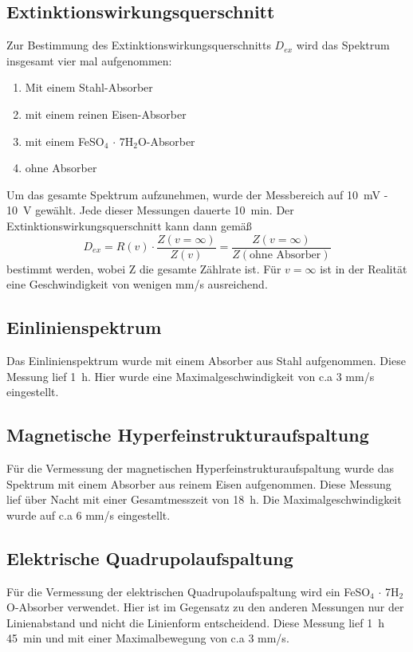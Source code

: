\documentclass[12pt,a4paper]{article}
\begin{document}
\subsection{Extinktionswirkungsquerschnitt}
Zur Bestimmung des Extinktionswirkungsquerschnitts $D_{ex}$ wird das Spektrum insgesamt vier mal aufgenommen:
\begin{enumerate}
\item Mit einem Stahl-Absorber
\item mit einem reinen Eisen-Absorber
\item mit einem FeSO$_4$ $\cdot$ 7H$_2$O-Absorber
\item ohne Absorber 
\end{enumerate} 
Um das gesamte Spektrum aufzunehmen, wurde der Messbereich auf \SI{10}{mV} - \SI{10}{V} gewählt. Jede dieser Messungen dauerte \SI{10}{min}. Der Extinktionswirkungsquerschnitt kann dann gemäß
\begin{equation}
D_{ex} = R(v) \cdot \dfrac{Z(v = \infty)}{Z(v)} = \dfrac{Z(v = \infty)}{Z(\textrm{ohne Absorber})}
\end{equation}
bestimmt werden, wobei Z die gesamte Zählrate ist. Für $v = \infty$ ist in der Realität eine Geschwindigkeit von wenigen mm/s ausreichend.

\subsection{Einlinienspektrum}
Das Einlinienspektrum wurde mit einem Absorber aus Stahl aufgenommen. Diese Messung lief \SI{1}{h}. Hier wurde eine Maximalgeschwindigkeit von c.a 3 mm/s eingestellt.

\subsection{Magnetische Hyperfeinstrukturaufspaltung}
Für die Vermessung der magnetischen Hyperfeinstrukturaufspaltung wurde das Spektrum mit einem Absorber aus reinem Eisen aufgenommen. Diese Messung lief über Nacht mit einer Gesamtmesszeit von \SI{18}{h}. Die Maximalgeschwindigkeit wurde auf c.a 6 mm/s eingestellt.


\subsection{Elektrische Quadrupolaufspaltung}
Für die Vermessung der elektrischen Quadrupolaufspaltung wird ein FeSO$_4$ $\cdot$ 7H$_2$O-Absorber verwendet. Hier ist im Gegensatz zu den anderen Messungen nur der Linienabstand und nicht die Linienform entscheidend. Diese Messung lief \SI{1}{h} \SI{45}{min} und mit einer Maximalbewegung von c.a 3 mm/s.
\newpage
\end{document}
